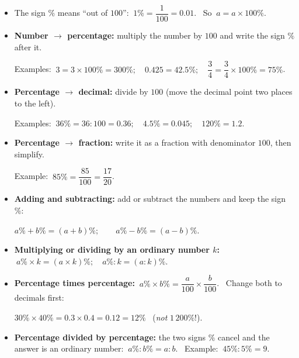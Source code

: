 \begin{knowbox}\begin{itemize}[leftmargin=1.4em,itemsep=3pt]
\item The sign $\%$ means ``out of $100$'': $\ 1\%=\dfrac1{100}=0.01$. \ So $\ a=a\times100\%$.
\item \textbf{Number $\to$ percentage:} multiply the number by $100$ and write the sign $\%$ after it.\par
Examples: $\ 3=3\times100\%=300\%;\quad 0.425=42.5\%;\quad \dfrac34=\dfrac34\times100\%=75\%$.
\item \textbf{Percentage $\to$ decimal:} divide by $100$ (move the decimal point two places to the left).\par
Examples: $\ 36\%=36:100=0.36;\quad 4.5\%=0.045;\quad 120\%=1.2$.
\item \textbf{Percentage $\to$ fraction:} write it as a fraction with denominator $100$, then simplify.\par
Example: $\ 85\%=\dfrac{85}{100}=\dfrac{17}{20}$.
\end{itemize}
\end{knowbox}
\gap
{}
\begin{knowbox}\begin{itemize}[leftmargin=1.4em,itemsep=3pt]
\item \textbf{Adding and subtracting:} add or subtract the numbers and keep the sign $\%$:\par
$a\%+b\%=(a+b)\%;\qquad a\%-b\%=(a-b)\%$.
\item \textbf{Multiplying or dividing by an ordinary number $k$:} $\ a\%\times k=(a\times k)\%;\quad a\%:k=(a:k)\%$.
\item \textbf{Percentage times percentage:} $\ a\%\times b\%=\dfrac a{100}\times\dfrac b{100}$. \ Change both to decimals first:\par
$30\%\times40\%=0.3\times0.4=0.12=12\%$ \ (\emph{not} $1\,200\%$!).
\item \textbf{Percentage divided by percentage:} the two signs $\%$ cancel and the answer is an ordinary number: $\ a\%:b\%=a:b$. \ Example: $\ 45\%:5\%=9$.
\end{itemize}
\end{knowbox}
\gap
{}
